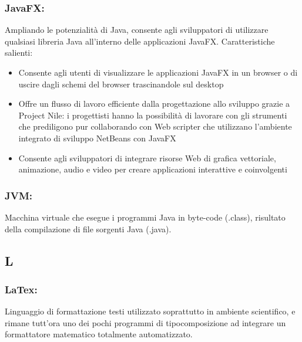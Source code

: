 \subsubsection*{JavaFX:} Ampliando le potenzialit\`a di Java, consente agli
sviluppatori di utilizzare qualsiasi libreria Java all'interno delle applicazioni JavaFX.
Caratteristiche salienti:
\begin{itemize}
\item Consente agli utenti di visualizzare le applicazioni JavaFX in un browser
o di uscire dagli schemi del browser trascinandole sul desktop 
\item Offre un flusso di lavoro efficiente dalla progettazione allo sviluppo
grazie a Project Nile: i progettisti hanno la possibilit\`a di lavorare con gli strumenti
che prediligono pur collaborando con Web scripter che utilizzano l'ambiente
integrato di sviluppo NetBeans con JavaFX
\item Consente agli sviluppatori di integrare risorse Web di grafica vettoriale,
animazione, audio e video per creare applicazioni interattive e coinvolgenti
\end{itemize}

\subsubsection*{JVM:} Macchina virtuale che esegue i programmi Java in byte-code
(.class), risultato della compilazione di file sorgenti Java (.java).


\subsection*{\huge{L}}
\subsubsection*{LaTex:} Linguaggio di formattazione testi utilizzato
soprattutto in ambiente scientifico, e rimane tutt'ora uno dei pochi programmi
di tipocomposizione ad integrare un formattatore matematico totalmente automatizzato.

